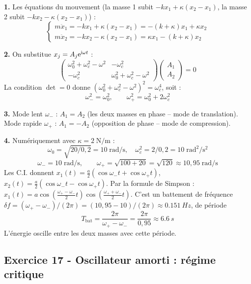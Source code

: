 \documentclass[12pt,a4paper]{article}
\begin{document}
\begin{boitecorrige}
\textbf{1.} Les équations du mouvement (la masse 1 subit $-kx_1+\kappa(x_2-x_1)$, la masse 2 subit $-kx_2-\kappa(x_2-x_1)$) :
\[
\begin{cases}
m\ddot x_1 = -kx_1 + \kappa(x_2-x_1) = -(k+\kappa)x_1 + \kappa x_2\\
m\ddot x_2 = -kx_2 - \kappa(x_2-x_1) = \kappa x_1 - (k+\kappa)x_2
\end{cases}
\]

\textbf{2.} On substitue $x_j = A_j\mathrm{e}^{\mathrm{i}\omega t}$ :
\[
\begin{pmatrix} \omega_0^2+\omega_c^2-\omega^2 & -\omega_c^2 \\ -\omega_c^2 & \omega_0^2+\omega_c^2-\omega^2 \end{pmatrix}\begin{pmatrix}A_1\\A_2\end{pmatrix}=0
\]
La condition $\det = 0$ donne $(\omega_0^2+\omega_c^2-\omega^2)^2 = \omega_c^4$, soit :
\[
\omega_-^2 = \omega_0^2, \qquad \omega_+^2 = \omega_0^2 + 2\omega_c^2
\]

\textbf{3.} Mode lent $\omega_-$ : $A_1=A_2$ (les deux masses en phase -- mode de translation). Mode rapide $\omega_+$ : $A_1=-A_2$ (opposition de phase -- mode de compression).

\textbf{4.} Numériquement avec $\kappa=2\;\text{N/m}$ :
\[
\omega_0 = \sqrt{20/0{,}2} = 10\;\text{rad/s}, \quad \omega_c^2 = 2/0{,}2 = 10\;\text{rad}^2/\text{s}^2
\]
\[
\omega_- = 10\;\text{rad/s}, \qquad \omega_+ = \sqrt{100+20} = \sqrt{120} \approx 10{,}95\;\text{rad/s}
\]
Les C.I. donnent $x_1(t)=\frac{a}{2}(\cos\omega_- t+\cos\omega_+ t)$, $x_2(t)=\frac{a}{2}(\cos\omega_- t-\cos\omega_+ t)$.
Par la formule de Simpson : $x_1(t) = a\cos\!\left(\frac{\omega_+-\omega_-}{2}t\right)\cos\!\left(\frac{\omega_++\omega_-}{2}t\right)$.
C'est un battement de fréquence $\delta f = (\omega_+-\omega_-)/(2\pi)=(10{,}95-10)/(2\pi)\approx\qty{0.151}{Hz}$, de période
\[
T_\text{bat} = \frac{2\pi}{\omega_+-\omega_-} = \frac{2\pi}{0{,}95} \approx \qty{6.6}{s}
\]
L'énergie oscille entre les deux masses avec cette période.
\end{boitecorrige}

\subsection*{Exercice 17 - Oscillateur amorti : régime critique \niveau{\moyen}}
\end{document}
